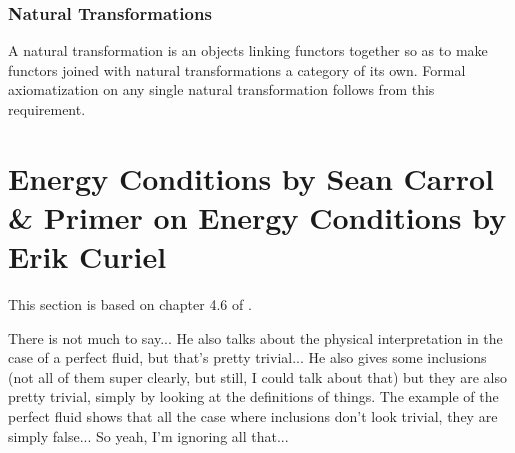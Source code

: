 \documentclass[a4paper,11pt]{article}
\numberwithin{equation}{section}
\theoremstyle{definition}
\begin{document}
\subsubsection{Natural Transformations}
A natural transformation is an objects linking functors together so as to make functors joined with natural transformations a category of its own. Formal axiomatization on any single natural transformation follows from this requirement.



\newpage


\section{Energy Conditions by Sean Carrol \& Primer on Energy Conditions by Erik Curiel}
This section is based on chapter 4.6 of \cite{E_Cond}.

\color{red} There is not much to say... He also talks about the physical interpretation in the case of a perfect fluid, but that's pretty trivial... He also gives some inclusions (not all of them super clearly, but still, I could talk about that) but they are also pretty trivial, simply by looking at the definitions of things. The example of the perfect fluid shows that all the case where inclusions don't look trivial, they are simply false... So yeah, I'm ignoring all that...\color{black}
\end{document}
